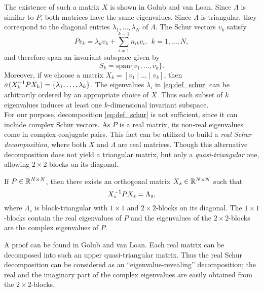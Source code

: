 The existence of such a matrix $X$ is shown in Golub and van Loan\cite[Theorem 7.1.3]{golub1996}.
Since $\Lambda$ is similar to $P$, both matrices have the same eigenvalues.   %
Since $\Lambda$ is triangular, they correspond to the diagonal entries $\lambda_1, \dots, \lambda_N$ of $\Lambda$.
The Schur vectors $v_k$ satisfy
\begin{equation*}
	Pv_k = \lambda_k v_k + \sum_{i=1}^{k-1} n_{ik} v_i, \ \ k=1,\dots,N,
\end{equation*}
and therefore span an invariant subspace given by
\begin{equation*}
S_k = \mathrm{span}\{v_1,\dots,v_k\}.
\end{equation*}
Moreover, if we choose a matrix $X_k = [v_1 \mid \dots \mid v_k]$, then $\sigma(X_k^{-1} P X_k) = \{\lambda_1, \dots, \lambda_k\}$.
The eigenvalues $\lambda_i$ in \eqref{eq:def_schur} can be arbitrarily ordered by an appropriate choice of $X$.
Thus each subset of $k$ eigenvalues induces at least one $k$-dimensional invariant subspace.
\\

For our purpose, decomposition \eqref{eq:def_schur} is not sufficient, since it can include complex Schur vectors.
As $P$ is a real matrix, its non-real eigenvalues come in complex conjugate pairs. This fact can be utilized to build a \textit{real Schur decomposition}, where both $X$ and $\Lambda$ are real matrices.
Though this alternative decomposition does not yield a triangular matrix, but only a \textit{quasi-triangular} one, allowing $2 \times 2$-blocks on its diagonal. %

\begin{thm}
If $P \in \mathbb{R}^{N \times N}$, then there exists an orthogonal matrix $X_s \in \mathbb{R}^{N \times N}$ such that
\begin{equation*}
X_s^{-1} PX_s = \Lambda_s,
\end{equation*}
where $\Lambda_s$ is block-triangular with $1 \times 1$ and $2 \times 2$-blocks on its diagonal. The $1 \times 1$-blocks contain the real eigenvalues of $P$ and the eigenvalues of the $2 \times 2$-blocks are the complex eigenvalues of $P$.
\end{thm}
A proof can be found in Golub and van Loan\cite[Theorem 7.4.1]{golub1996}.
Each real matrix can be decomposed into such an upper quasi-triangular matrix. Thus the real Schur decomposition can be considered as an ``eigenvalue-revealing'' decomposition; %
the real and the imaginary part of the complex eigenvalues are easily obtained from the $2 \times 2$-blocks.

